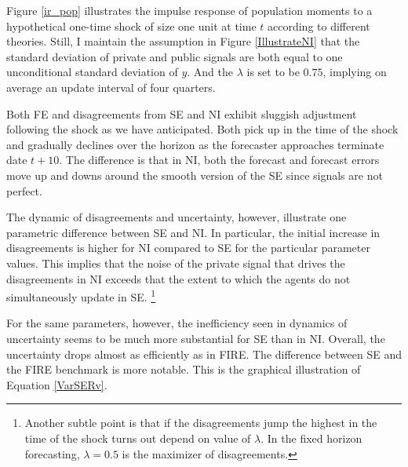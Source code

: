 \documentclass[12pt]{article}
\begin{document}
	Figure \ref{ir_pop} illustrates the impulse response of population moments to a hypothetical one-time shock of size one unit at time $t$ according to different theories. Still, I maintain the assumption in Figure \ref{IllustrateNI} that the standard deviation of private and public signals are both equal to one unconditional standard deviation of $y$.  And the $\lambda$ is set to be $0.75$, implying on average an update interval of four quarters.  
	
	
	Both FE and disagreements from SE and NI exhibit sluggish adjustment following the shock as we have anticipated. Both pick up in the time of the shock and gradually declines over the horizon as the forecaster approaches terminate date $t+10$. The difference is that in NI, both the forecast and forecast errors move up and downs around the smooth version of the SE since signals are not perfect. 
	
	The dynamic of disagreements and uncertainty, however,  illustrate one parametric difference between SE and NI. In particular,  the initial increase in disagreements is higher for NI compared to SE for the particular parameter values. This implies that the noise of the private signal that drives the disagreements in NI exceeds that the extent to which the agents do not simultaneously update in SE. \footnote{Another subtle point is that if the disagreements jump the highest in the time of the shock turns out depend on value of $\lambda$. In the fixed horizon forecasting, $\lambda=0.5$ is the maximizer of disagreements.}
	
	For the same parameters, however, the inefficiency seen in dynamics of uncertainty seems to be much more substantial for SE than in NI. Overall, the uncertainty drops almost as efficiently as in FIRE. The difference between SE and the FIRE benchmark is more notable. This is the graphical illustration of Equation \ref{VarSERv}. 
	
\end{document}
